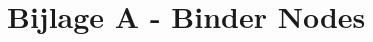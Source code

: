 \documentclass[a4paper]{report}
\begin{document}
\section{Bijlage A - Binder Nodes}
\label{bijlage:bindernodes}
\begin{minipage}{\textwidth}
  \centering
\end{minipage}
\clearpage
\end{document}
